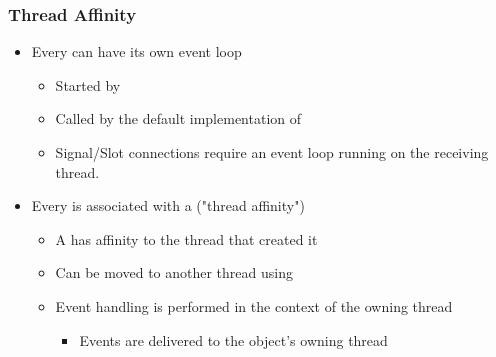 \begin{slide}
\frametitle{Thread Affinity}

\begin{itemize}
\item Every  can have its own event loop
  \begin{itemize}
  \item Started by 
  \item Called by the default implementation of 
  \item Signal/Slot connections require an event loop running on the receiving thread.
  \end{itemize}
\item Every  is associated with a  ("thread affinity")
  \begin{itemize}
  \item A  has affinity to the thread that created it
  \item Can be moved to another thread using 
  \item Event handling is performed in the context of the owning thread
    \begin{itemize}
    \item Events are delivered to the object's owning thread
    \end{itemize}
  \end{itemize}
\end{itemize}

\end{slide}


